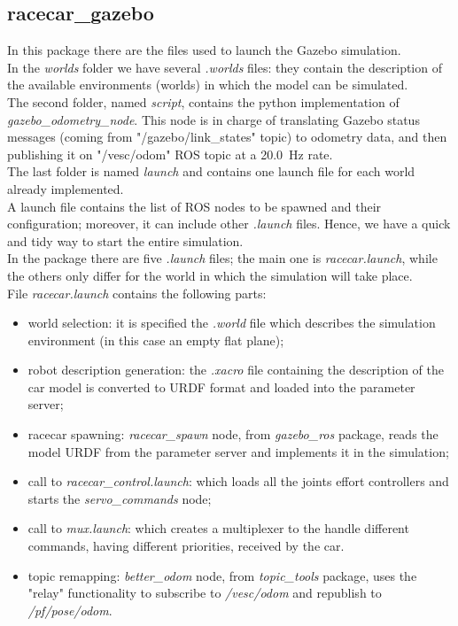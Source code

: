 \subsection{racecar\_gazebo}
In this package there are the files used to launch the Gazebo simulation.\\
In the \textit{worlds} folder we have several \textit{.worlds} files: they contain the description
of the available environments (worlds) in which the model can be simulated. \\
The second folder, named \textit{script}, contains the python implementation of \textit{gazebo\_odometry\_node}. 
This node is in charge of translating Gazebo status messages (coming from "/gazebo/link\_states" topic) to odometry data,
and then publishing it on "/vesc/odom" ROS topic at a \SI{20.0}{\hertz} rate. \\
The last folder is named \textit{launch} and contains one launch file for each world already implemented. \\
A launch file contains the list of ROS nodes to be spawned and their configuration; moreover, it can include
other \textit{.launch} files. Hence, we have a quick and tidy way to start the entire simulation. \\
In the package there are five \textit{.launch} files; the main one is \textit{racecar.launch}, while the others
only differ for the world in which the simulation will take place. \\
File \textit{racecar.launch} contains the following parts:  
\begin{itemize}
    \item world selection: it is specified the \textit{.world} file which describes the simulation environment (in this case
          an empty flat plane);
    \item robot description generation: the \textit{.xacro} file containing the description of the car model is converted 
          to URDF format and loaded into the parameter server;
    \item racecar spawning: \textit{racecar\_spawn} node, from \textit{gazebo\_ros} package, reads the model URDF from 
          the parameter server and implements it in the simulation; 
    \item call to \textit{racecar\_control.launch}: which loads all the joints effort controllers and starts the 
          \textit{servo\_commands} node; 
    \item call to \textit{mux.launch}: which creates a multiplexer to the handle different commands, having different priorities,
          received by the car. 
    \item topic remapping: \textit{better\_odom} node, from \textit{topic\_tools} package, uses the "relay" functionality 
          to subscribe to \textit{/vesc/odom} and republish to \textit{/pf/pose/odom}. 
\end{itemize}

